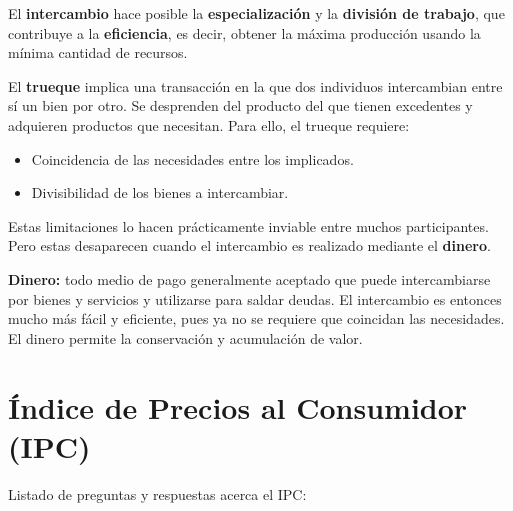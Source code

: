 \documentclass[10pt,a4paper]{article}
\begin{document}
El \textbf{intercambio} hace posible la \textbf{especialización} y la \textbf{división de trabajo}, que contribuye a la \textbf{eficiencia}, es decir, obtener la máxima producción usando la mínima cantidad de recursos.

El \textbf{trueque} implica una transacción en la que dos individuos intercambian entre sí un bien por otro. Se desprenden del producto del que tienen excedentes y adquieren productos que necesitan. Para ello, el trueque requiere: 

\begin{itemize}
\item Coincidencia de las necesidades entre los implicados.
\item Divisibilidad de los bienes a intercambiar.
\end{itemize}

Estas limitaciones lo hacen prácticamente inviable entre muchos participantes. Pero estas desaparecen cuando el intercambio es realizado mediante el \textbf{dinero}.

\begin{description}
\item \textbf{Dinero:} todo medio de pago generalmente aceptado que puede intercambiarse por bienes y servicios y utilizarse para saldar deudas. El intercambio es entonces mucho más fácil y eficiente, pues ya no se requiere que coincidan las necesidades. El dinero permite la conservación y acumulación de valor.
\end{description}

\newpage
\part{Índice de Precios al Consumidor (IPC)}

Listado de preguntas y respuestas acerca el IPC:
\end{document}

